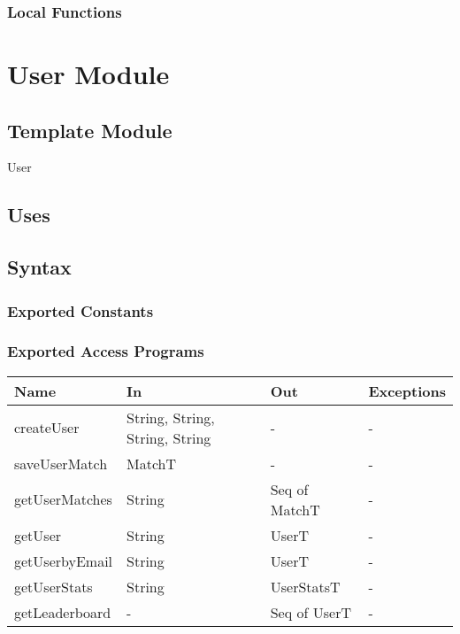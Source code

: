 \documentclass[12pt, titlepage]{article}
\begin{document}
\subsubsection{Local Functions}

\newpage


\section{User Module} \label{User}

\subsection{Template Module}

User

\subsection{Uses}


\subsection{Syntax}

\subsubsection{Exported Constants}

\subsubsection{Exported Access Programs}

\begin{center}
\begin{tabular}{|p{4cm}| p{4cm}| p{4cm} | p{3cm}|}
\hline
\textbf{Name} & \textbf{In} & \textbf{Out} & \textbf{Exceptions} \\
\hline
createUser & String, String, String, String & - & - \\
saveUserMatch & MatchT &- &- \\
getUserMatches & String & Seq of MatchT & -\\
getUser & String & UserT & -\\
getUserbyEmail & String & UserT & -\\
getUserStats & String & UserStatsT & -\\
getLeaderboard & - & Seq of UserT & -\\

\hline
\end{tabular}
\end{center}
\end{document}
